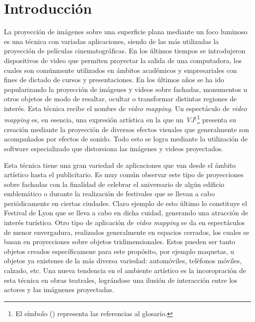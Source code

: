 ﻿\chapter{Introducción}%

La proyección de imágenes sobre una superficie plana mediante un foco luminoso es una técnica con variadas aplicaciones, siendo de las más utilizadas la proyección de películas cinematográficas. En los últimos tiempos se introdujeron dispositivos de video que permiten proyectar la salida de una computadora, los cuales son comúnmente utilizados en ámbitos académicos y empresariales con fines de dictado de cursos y presentaciones. En los últimos años se ha ido popularizando la proyección de imágenes y videos sobre fachadas, monumentos u otros objetos de modo de resaltar, ocultar o transformar distintas regiones de interés. Esta técnica recibe el nombre de \emph{video mapping}.
Un espectáculo de \emph{video mapping} es, en esencia, una expresión artística en la que un \emph{VJ}$^\dagger$\footnote{El símbolo (\dag) representa las referencias al glosario.} presenta su creación mediante la proyección de diversos efectos visuales que generalmente son acompañados por efectos de sonido. Todo esto se logra mediante la utilización de software especializado que distorsiona las imágenes y videos proyectados.


Esta técnica tiene una gran variedad de aplicaciones que van desde el ámbito artístico hasta el publicitario. 
Es muy común observar este tipo de proyecciones sobre fachadas con la finalidad de celebrar el aniversario de algún edificio emblemático o durante la realización de festivales que se llevan a cabo periódicamente en ciertas ciudades. Claro ejemplo de esto último lo constituye el Festival de Lyon \cite{FestivalLyon} que se lleva a cabo en dicha cuidad, generando una atracción de interés turístico.
Otro tipo de aplicación de \emph{video mapping} se da en espectáculos de menor envergadura, realizados generalmente en espacios cerrados, los cuales se basan en proyecciones sobre objetos tridimensionales. Estos pueden ser tanto objetos creados específicamene para este propósito, por ejemplo maquetas, u objetos ya existenes de la más diversa variedad: automóviles, teléfonos móviles, calzado, etc. Una nueva tendencia en el ambiente artístico es la incoropración de esta técnica en obras teatrales, lográndose una ilusión de interacción entre los actores y las imágnenes proyectadas.

